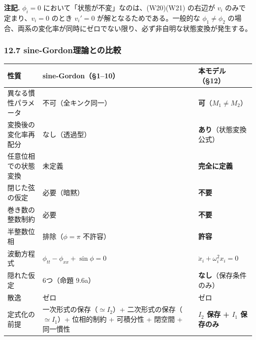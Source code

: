 \documentclass[a4paper,11pt]{ltjsarticle}
\newcounter{none}
\begin{document}
\textbf{注記.} \(\phi_i = 0\) において「状態が不変」なのは、(W20)(W21)
の右辺が \(v_i\) のみで定まり、\(v_i = 0\) のとき \(v_i' = 0\)
が解となるためである。一般的な \(\phi_1 \neq \phi_2\)
の場合、両系の変化率が同時にゼロでない限り、必ず非自明な状態変換が発生する。

\subsubsection{12.7
sine-Gordon理論との比較}\label{sine-gordonux7406ux8ad6ux3068ux306eux6bd4ux8f03}

{\def\LTcaptype{none} %
\begin{longtable}[]{@{}
  >{\raggedright\arraybackslash}p{}
  >{\raggedright\arraybackslash}p{}
  >{\raggedright\arraybackslash}p{}@{}}
\toprule\noalign{}
\begin{minipage}[b]{\linewidth}\raggedright
性質
\end{minipage} & \begin{minipage}[b]{\linewidth}\raggedright
sine-Gordon（§1--10）
\end{minipage} & \begin{minipage}[b]{\linewidth}\raggedright
本モデル（§12）
\end{minipage} \\
\midrule\noalign{}
\endhead
\bottomrule\noalign{}
\endlastfoot
異なる慣性パラメータ & 不可（全キンク同一） &
\textbf{可}（\(M_1 \neq M_2\)） \\
変換後の変化率再配分 & なし（透過型） & \textbf{あり}（状態変換公式） \\
任意位相での状態変換 & 未定義 & \textbf{完全に定義} \\
閉じた弦の仮定 & 必要（暗黙） & \textbf{不要} \\
巻き数の整数制約 & 必要 & \textbf{不要} \\
半整数位相 & 排除（\(\phi = \pi\) 不許容） & \textbf{許容} \\
波動方程式 & \(\phi_{tt} - \phi_{xx} + \sin\phi = 0\) &
\(\ddot{x}_i + \omega_i^2 x_i = 0\) \\
隠れた仮定 & 6つ（命題 9.6a） & \textbf{なし}（保存条件のみ） \\
散逸 & ゼロ & ゼロ \\
定式化の前提 & 一次形式の保存（\(\simeq I_2\)）+
二次形式の保存（\(\simeq I_1\)）+ 位相的制約 + 可積分性 + 閉空間 +
同一慣性 & \textbf{\(I_2\) 保存 + \(I_1\) 保存のみ} \\
\end{longtable}
}
\end{document}
